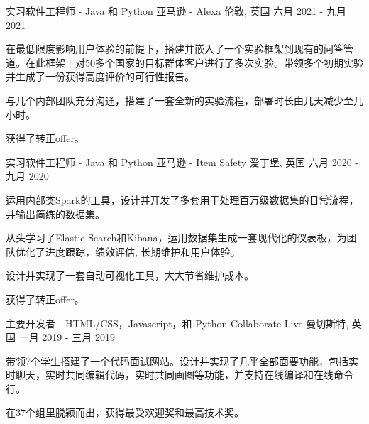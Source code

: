 

\begin{cventries}

  \cventry
    {实习软件工程师 - Java 和 Python} %
    {亚马逊 - Alexa} %
    {伦敦, 英国} %
    {六月 2021 - 九月 2021} %
    {
      \begin{cvitems} %
        \item {在最低限度影响用户体验的前提下，搭建并嵌入了一个实验框架到现有的问答管道。在此框架上对50多个国家的目标群体客户进行了多次实验。带领多个初期实验并生成了一份获得高度评价的可行性报告。}
        \item {与几个内部团队充分沟通，搭建了一套全新的实验流程，部署时长由几天减少至几小时。}
        \item {获得了转正offer。}
      \end{cvitems}
    }

  \cventry
    {实习软件工程师 - Java 和 Python} %
    {亚马逊 - Item Safety} %
    {爱丁堡, 英国} %
    {六月 2020 - 九月 2020} %
    {
      \begin{cvitems} %
        \item {运用内部类Spark的工具，设计并开发了多套用于处理百万级数据集的日常流程，并输出简练的数据集。}
        \item {从头学习了Elastic Search和Kibana，运用数据集生成一套现代化的仪表板，为团队优化了进度跟踪，绩效评估, 长期维护和用户体验。}
        \item {设计并实现了一套自动可视化工具，大大节省维护成本。}
        \item {获得了转正offer。}
      \end{cvitems}
    }

  \cventry
    {主要开发者 - HTML/CSS，Javascript，和 Python} %
    {Collaborate Live} %
    {曼切斯特, 英国} %
    {一月 2019 - 三月 2019} %
    {
      \begin{cvitems} %
        \item {带领7个学生搭建了一个代码面试网站。设计并实现了几乎全部面要功能，包括实时聊天，实时共同编辑代码，实时共同画图等功能，并支持在线编译和在线命令行。}
        \item {在37个组里脱颖而出，获得最受欢迎奖和最高技术奖。}
      \end{cvitems}
    }
\end{cventries}

